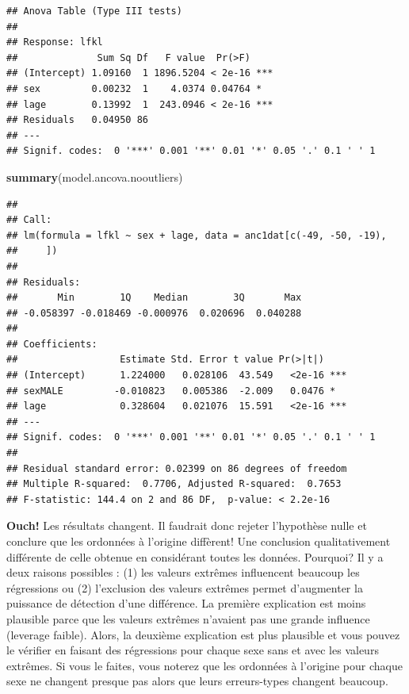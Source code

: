 \documentclass[
  12pt,
]{book}
\newenvironment{Shaded}{\begin{snugshade}}{\end{snugshade}}
\newcommand{\KeywordTok}[1]{\textcolor[rgb]{0.13,0.29,0.53}{\textbf{#1}}}
\newcommand{\NormalTok}[1]{#1}
\begin{document}
\begin{verbatim}
## Anova Table (Type III tests)
## 
## Response: lfkl
##              Sum Sq Df   F value  Pr(>F)    
## (Intercept) 1.09160  1 1896.5204 < 2e-16 ***
## sex         0.00232  1    4.0374 0.04764 *  
## lage        0.13992  1  243.0946 < 2e-16 ***
## Residuals   0.04950 86                      
## ---
## Signif. codes:  0 '***' 0.001 '**' 0.01 '*' 0.05 '.' 0.1 ' ' 1
\end{verbatim}

\begin{Shaded}
\begin{Highlighting}[]
\KeywordTok{summary}\NormalTok{(model.ancova.nooutliers)}
\end{Highlighting}
\end{Shaded}

\begin{verbatim}
## 
## Call:
## lm(formula = lfkl ~ sex + lage, data = anc1dat[c(-49, -50, -19), 
##     ])
## 
## Residuals:
##       Min        1Q    Median        3Q       Max 
## -0.058397 -0.018469 -0.000976  0.020696  0.040288 
## 
## Coefficients:
##                  Estimate Std. Error t value Pr(>|t|)    
## (Intercept)      1.224000   0.028106  43.549   <2e-16 ***
## sexMALE         -0.010823   0.005386  -2.009   0.0476 *  
## lage             0.328604   0.021076  15.591   <2e-16 ***
## ---
## Signif. codes:  0 '***' 0.001 '**' 0.01 '*' 0.05 '.' 0.1 ' ' 1
## 
## Residual standard error: 0.02399 on 86 degrees of freedom
## Multiple R-squared:  0.7706, Adjusted R-squared:  0.7653 
## F-statistic: 144.4 on 2 and 86 DF,  p-value: < 2.2e-16
\end{verbatim}

\textbf{Ouch!} Les résultats changent. Il faudrait donc rejeter l'hypothèse nulle et conclure que les ordonnées à l'origine diffèrent! Une conclusion qualitativement différente de celle obtenue en considérant toutes les données. Pourquoi? Il y a deux raisons possibles : (1) les valeurs extrêmes influencent beaucoup les régressions ou (2) l'exclusion des valeurs extrêmes permet d'augmenter la puissance de détection d'une différence. La première explication est moins plausible parce que les valeurs extrêmes n'avaient pas une grande influence (leverage faible). Alors, la deuxième explication est plus plausible et vous pouvez le vérifier en faisant des régressions pour chaque sexe sans et avec les valeurs extrêmes. Si vous le faites, vous noterez que les ordonnées à l'origine pour chaque sexe ne changent presque pas alors que leurs erreurs-types changent beaucoup.
\end{document}
